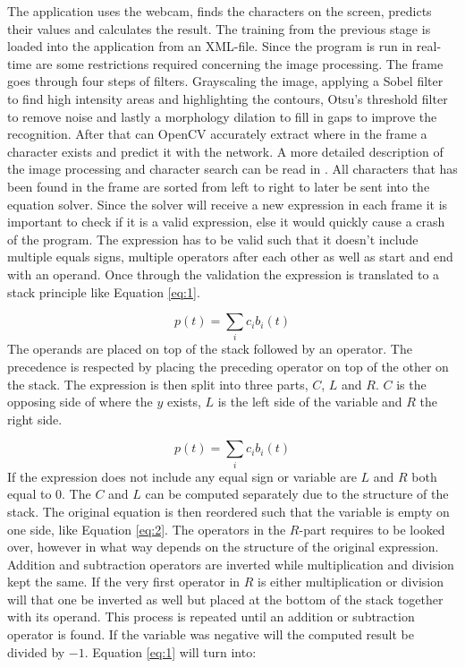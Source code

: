 \documentclass[12pt]{report}
\begin{document}
The application uses the webcam, finds the characters on the screen, predicts their values and calculates the result. The training from the previous stage is loaded into the application from an XML-file. Since the program is run in real-time are some restrictions required concerning the image processing. The frame goes through four steps of filters. Grayscaling the image, applying a Sobel filter to find high intensity areas and highlighting the contours, Otsu’s threshold filter to remove noise and lastly a morphology dilation to fill in gaps to improve the recognition. After that can OpenCV accurately extract where in the frame a character exists and predict it with the network. A more detailed description of the image processing and character search can be read in \cite{kristoffer}.
\newline
\newline
All characters that has been found in the frame are sorted from left to right to later be sent into the equation solver. Since the solver will receive a new expression in each frame it is important to check if it is a valid expression, else it would quickly cause a crash of the program. The expression has to be valid such that it doesn’t include multiple equals signs, multiple operators after each other as well as start and end with an operand. Once through the validation the expression is translated to a stack principle like Equation \ref{eq:1}.

\begin{equation}
  \label{eq:1}
  p(t) = \sum_i c_ib_i(t) %
\end{equation}
The operands are placed on top of the stack followed by an operator. The precedence is respected by placing the preceding operator on top of the other on the stack. The expression is then split into three parts, $C$, $L$ and $R$. $C$ is the opposing side of where the $y$ exists, $L$ is the left side of the variable and $R$ the right side.

\begin{equation}
  \label{eq:2}
  p(t) = \sum_i c_ib_i(t) %
\end{equation}
If the expression does not include any equal sign or variable are $L$ and $R$ both equal to $0$. The $C$ and $L$ can be computed separately due to the structure of the stack. The original equation is then reordered such that the variable is empty on one side, like Equation \ref{eq:2}. The operators in the $R$-part requires to be looked over, however in what way depends on the structure of the original expression. Addition and subtraction operators are inverted while multiplication and division kept the same. If the very first operator in $R$ is either multiplication or division will that one be inverted as well but placed at the bottom of the stack together with its operand. This process is repeated until an addition or subtraction operator is found. If the variable was negative will the computed result be divided by $-1$. Equation \ref{eq:1} will turn into:
\end{document}
